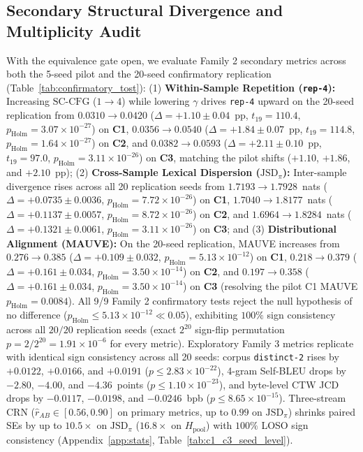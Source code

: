 \documentclass[11pt,a4paper]{article}
\begin{document}
\subsection{Secondary Structural Divergence and Multiplicity Audit}
With the equivalence gate open, we evaluate Family 2 secondary metrics across both the 5-seed pilot and the 20-seed confirmatory replication (Table~\ref{tab:confirmatory_tost}):
(1) \textbf{Within-Sample Repetition (\texttt{rep-4}):} Increasing $\text{SC-CFG}$ ($1 \to 4$) while lowering $\gamma$ drives \texttt{rep-4} upward on the 20-seed replication from $0.0310 \to 0.0420$ ($\Delta = +1.10\pm 0.04$~pp, $t_{19}=110.4$, $p_{\mathrm{Holm}} = 3.07\times 10^{-27}$) on \textbf{C1}, $0.0356 \to 0.0540$ ($\Delta = +1.84\pm 0.07$~pp, $t_{19}=114.8$, $p_{\mathrm{Holm}} = 1.64\times 10^{-27}$) on \textbf{C2}, and $0.0382 \to 0.0593$ ($\Delta = +2.11\pm 0.10$~pp, $t_{19}=97.0$, $p_{\mathrm{Holm}} = 3.11\times 10^{-26}$) on \textbf{C3}, matching the pilot shifts ($+1.10$, $+1.86$, and $+2.10$~pp);
(2) \textbf{Cross-Sample Lexical Dispersion ($\mathrm{JSD}_\pi$):} Inter-sample divergence rises across all 20 replication seeds from $1.7193 \to 1.7928$~nats ($\Delta = +0.0735\pm 0.0036$, $p_{\mathrm{Holm}} = 7.72\times 10^{-26}$) on \textbf{C1}, $1.7040 \to 1.8177$~nats ($\Delta = +0.1137\pm 0.0057$, $p_{\mathrm{Holm}} = 8.72\times 10^{-26}$) on \textbf{C2}, and $1.6964 \to 1.8284$~nats ($\Delta = +0.1321\pm 0.0061$, $p_{\mathrm{Holm}} = 3.11\times 10^{-26}$) on \textbf{C3}; and
(3) \textbf{Distributional Alignment (MAUVE):} On the 20-seed replication, MAUVE increases from $0.276 \to 0.385$ ($\Delta = +0.109\pm 0.032$, $p_{\mathrm{Holm}} = 5.13\times 10^{-12}$) on \textbf{C1}, $0.218 \to 0.379$ ($\Delta = +0.161\pm 0.034$, $p_{\mathrm{Holm}} = 3.50\times 10^{-14}$) on \textbf{C2}, and $0.197 \to 0.358$ ($\Delta = +0.161\pm 0.034$, $p_{\mathrm{Holm}} = 3.50\times 10^{-14}$) on \textbf{C3} (resolving the pilot C1 MAUVE $p_{\mathrm{Holm}}=0.0084$).
All 9/9 Family 2 confirmatory tests reject the null hypothesis of no difference ($p_{\mathrm{Holm}} \le 5.13\times 10^{-12} \ll 0.05$), exhibiting $100\%$ sign consistency across all $20/20$ replication seeds (exact $2^{20}$ sign-flip permutation $p = 2/2^{20} = 1.91\times 10^{-6}$ for every metric). Exploratory Family 3 metrics replicate with identical sign consistency across all 20 seeds: corpus \texttt{distinct-2} rises by $+0.0122$, $+0.0166$, and $+0.0191$ ($p \le 2.83\times 10^{-22}$), 4-gram Self-BLEU drops by $-2.80$, $-4.00$, and $-4.36$~points ($p \le 1.10\times 10^{-23}$), and byte-level CTW JCD drops by $-0.0117$, $-0.0198$, and $-0.0246$~bpb ($p \le 8.65\times 10^{-15}$). Three-stream CRN ($\hat{r}_{AB} \in [0.56, 0.90]$ on primary metrics, up to $0.99$ on $\mathrm{JSD}_\pi$) shrinks paired SEs by up to $10.5\times$ on $\mathrm{JSD}_\pi$ ($16.8\times$ on $H_{\mathrm{pool}}$) with $100\%$ LOSO sign consistency (Appendix~\ref{app:stats}, Table~\ref{tab:c1_c3_seed_level}).
\end{document}
